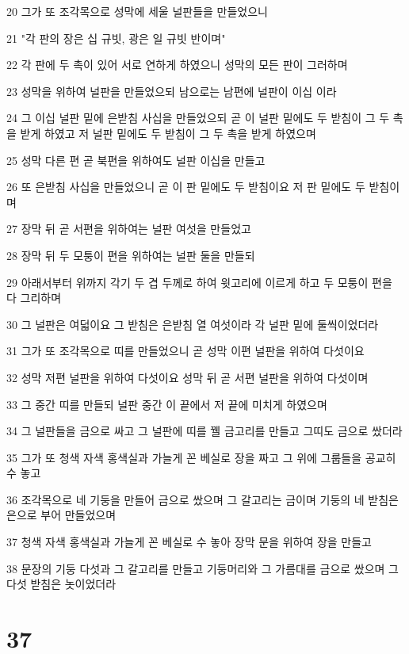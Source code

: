 \par 20 그가 또 조각목으로 성막에 세울 널판들을 만들었으니
\par 21 "각 판의 장은 십 규빗, 광은 일 규빗 반이며"
\par 22 각 판에 두 촉이 있어 서로 연하게 하였으니 성막의 모든 판이 그러하며
\par 23 성막을 위하여 널판을 만들었으되 남으로는 남편에 널판이 이십 이라
\par 24 그 이십 널판 밑에 은받침 사십을 만들었으되 곧 이 널판 밑에도 두 받침이 그 두 촉을 받게 하였고 저 널판 밑에도 두 받침이 그 두 촉을 받게 하였으며
\par 25 성막 다른 편 곧 북편을 위하여도 널판 이십을 만들고
\par 26 또 은받침 사십을 만들었으니 곧 이 판 밑에도 두 받침이요 저 판 밑에도 두 받침이며
\par 27 장막 뒤 곧 서편을 위하여는 널판 여섯을 만들었고
\par 28 장막 뒤 두 모퉁이 편을 위하여는 널판 둘을 만들되
\par 29 아래서부터 위까지 각기 두 겹 두께로 하여 윗고리에 이르게 하고 두 모퉁이 편을 다 그리하며
\par 30 그 널판은 여덟이요 그 받침은 은받침 열 여섯이라 각 널판 밑에 둘씩이었더라
\par 31 그가 또 조각목으로 띠를 만들었으니 곧 성막 이편 널판을 위하여 다섯이요
\par 32 성막 저편 널판을 위하여 다섯이요 성막 뒤 곧 서편 널판을 위하여 다섯이며
\par 33 그 중간 띠를 만들되 널판 중간 이 끝에서 저 끝에 미치게 하였으며
\par 34 그 널판들을 금으로 싸고 그 널판에 띠를 꿸 금고리를 만들고 그띠도 금으로 쌌더라
\par 35 그가 또 청색 자색 홍색실과 가늘게 꼰 베실로 장을 짜고 그 위에 그룹들을 공교히 수 놓고
\par 36 조각목으로 네 기둥을 만들어 금으로 쌌으며 그 갈고리는 금이며 기둥의 네 받침은 은으로 부어 만들었으며
\par 37 청색 자색 홍색실과 가늘게 꼰 베실로 수 놓아 장막 문을 위하여 장을 만들고
\par 38 문장의 기둥 다섯과 그 갈고리를 만들고 기둥머리와 그 가름대를 금으로 쌌으며 그 다섯 받침은 놋이었더라

\chapter{37}

